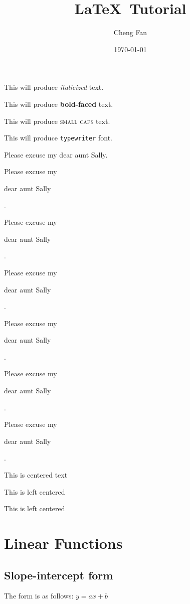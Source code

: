 \documentclass[11pt]{article}
\begin{document}
\tableofcontents

\title{\LaTeX \ Tutorial}
\author{Cheng Fan}
\date{\today}
\maketitle

This will produce \textit{italicized} text.

This will produce \textbf{bold-faced} text.

This will produce \textsc{small caps} text.

This will produce \texttt{typewriter} font.

Please excuse my dear aunt Sally.

Please excuse my \begin{large} dear aunt Sally \end{large}.

Please excuse my \begin{Large} dear aunt Sally \end{Large}.

Please excuse my \begin{huge} dear aunt Sally \end{huge}.

Please excuse my \begin{Huge} dear aunt Sally \end{Huge}.

Please excuse my \begin{small} dear aunt Sally \end{small}.

Please excuse my \begin{tiny} dear aunt Sally \end{tiny}.

\begin{center}
This is centered text
\end{center}

\begin{flushleft}
This is left centered
\end{flushleft}

\begin{flushright}
This is left centered
\end{flushright}

\section{Linear Functions}
 \subsection{Slope-intercept form}
 The form is as follows: $y=ax+b$
\end{document}
